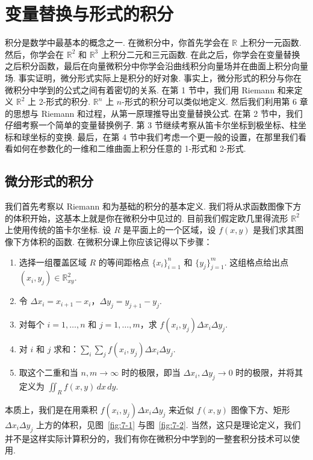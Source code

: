 \chapter{变量替换与形式的积分}

积分是数学中最基本的概念之一. 在微积分中，你首先学会在 $\mathbb{R}$ 上积分一元函数. 然后，你学会在 $\mathbb{R}^2$ 和 $\mathbb{R}^3$ 上积分二元和三元函数. 在此之后，你学会在变量替换之后积分函数，最后在向量微积分中你学会沿曲线积分向量场并在曲面上积分向量场. 事实证明，微分形式实际上是积分的好对象. 事实上，微分形式的积分与你在微积分中学到的公式之间有着密切的关系. 在第 1 节中，我们用 Riemann 和来定义 $\mathbb{R}^2$ 上 2-形式的积分. $\mathbb{R}^n$ 上 $n$-形式的积分可以类似地定义. 然后我们利用第 6 章的思想与 Riemann 和过程，从第一原理推导出变量替换公式. 在第 2 节中，我们仔细考察一个简单的变量替换例子. 第 3 节继续考察从笛卡尔坐标到极坐标、柱坐标和球坐标的变换. 最后，在第 4 节中我们考虑一个更一般的设置，在那里我们看看如何在参数化的一维和二维曲面上积分任意的 1-形式和 2-形式.

\section{微分形式的积分}

我们首先考察以 Riemann 和为基础的积分的基本定义. 我们将从求函数图像下方的体积开始，这基本上就是你在微积分中见过的. 目前我们假定欧几里得流形 $\mathbb{R}^2$ 上使用传统的笛卡尔坐标. 设 $R$ 是平面上的一个区域，设 $f(x,y)$ 是我们求其图像下方体积的函数. 在微积分课上你应该记得以下步骤：
\begin{enumerate}
  \item 选择一组覆盖区域 $R$ 的等间距格点 $\{x_i\}_{i=1}^{n}$ 和 $\{y_j\}_{j=1}^{m}$. 这组格点给出点 $(x_i,y_j)\in\mathbb{R}^2_{xy}$.
  \item 令 $\Delta x_i=x_{i+1}-x_i$，$\Delta y_j=y_{j+1}-y_j$.
  \item 对每个 $i=1,\ldots,n$ 和 $j=1,\ldots,m$，求 $f(x_i,y_j)\Delta x_i\Delta y_j$.
  \item 对 $i$ 和 $j$ 求和：$\sum_i\sum_j f(x_i,y_j)\Delta x_i\Delta y_j$.
  \item 取这个二重和当 $n,m\to\infty$ 时的极限，即当 $\Delta x_i,\Delta y_j\to 0$ 时的极限，并将其定义为 $\iint_R f(x,y)\,dx\,dy$.
\end{enumerate}
本质上，我们是在用乘积 $f(x_i,y_j)\Delta x_i\Delta y_j$ 来近似 $f(x,y)$ 图像下方、矩形 $\Delta x_i\Delta y_j$ 上方的体积，见图~\ref{fig:7-1} 与图~\ref{fig:7-2}. 当然，这只是理论定义，我们并不是这样实际计算积分的，我们有你在微积分中学到的一整套积分技术可以使用.

